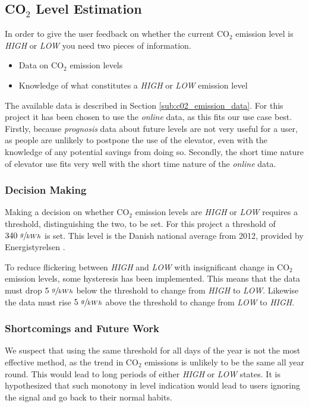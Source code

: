 \documentclass[Main]{subfiles}
\begin{document}
\subsection{CO$_2$ Level Estimation} %
\label{sub:co__2_level_estimation}

	In order to give the user feedback on whether the current CO$_2$ emission level is \emph{HIGH} or \emph{LOW} you need two pieces of information.

	\begin{itemize}
		\item Data on CO$_2$ emission levels
		\item Knowledge of what constitutes a \emph{HIGH} or \emph{LOW} emission level
	\end{itemize}

	The available data is described in Section \ref{sub:c02_emission_data}.
	For this project it has been chosen to use the \emph{online} data, as this fits our use case best.
	Firstly, because \emph{prognosis} data about future levels are not very useful for a user, as people are unlikely to postpone the use of the elevator, even with the knowledge of any potential savings from doing so.
	Secondly, the short time nature of elevator use fits very well with the short time nature of the \emph{online} data.
 

	\subsubsection{Decision Making} %
	\label{sub:decision_making}

		Making a decision on whether CO$_2$ emission levels are \emph{HIGH} or \emph{LOW} requires a threshold, distinguishing the two, to be set.
		For this project a threshold of $340\ \sfrac{g}{kWh}$ is set.
		This level is the Danish national average from 2012, provided by Energistyrelsen \cite{Energistyrelsen:2012:Online}.

		To reduce flickering between \emph{HIGH} and \emph{LOW} with insignificant change in CO$_2$ emission levels, some hysteresis has been implemented.
		This means that the data must drop $5\ \sfrac{g}{kWh}$ below the threshold to change from \emph{HIGH} to \emph{LOW}.
		Likewise the data must rise $5\ \sfrac{g}{kWh}$ above the threshold to change from \emph{LOW} to \emph{HIGH}.
	


	\subsubsection{Shortcomings and Future Work} %
	\label{sub:shortcomings_and_future_work}
		We suspect that using the same threshold for all days of the year is not the most effective method, as the trend in CO$_2$ emissions is unlikely to be the same all year round.
		This would lead to long periods of either \emph{HIGH} or \emph{LOW} states.
		It is hypothesized that such monotony in level indication would lead to users ignoring the signal and go back to their normal habits.
\end{document}
